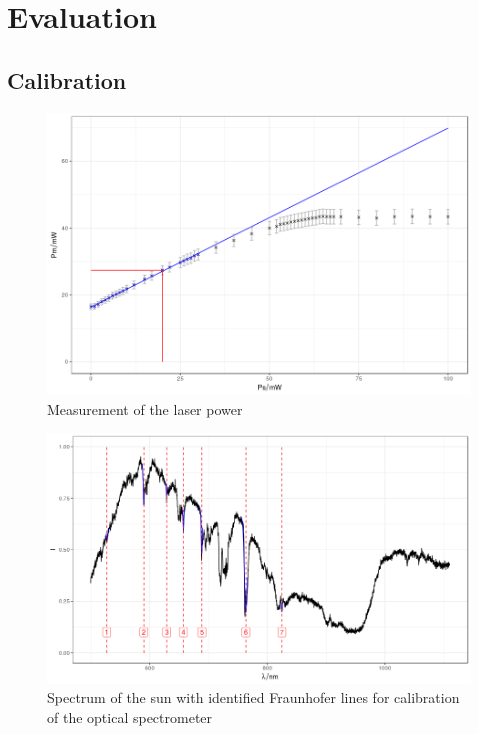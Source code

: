 \section{Evaluation}
\subsection{Calibration}

\begin{figure}
	\centering
	\includegraphics[width=\textwidth]{../figures/powercal.png}
	\caption{Measurement of the laser power}
	\label{fig:power}
\end{figure}

\begin{figure}
	\centering
	\includegraphics[width=\textwidth]{../figures/sunspectrum.png}
	\caption{Spectrum of the sun with identified Fraunhofer lines for calibration of the optical spectrometer}
	\label{fig:sunspectrum}
\end{figure}

